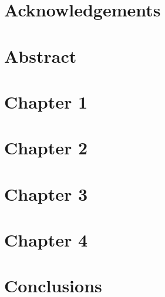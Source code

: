 \documentclass[12pt,oneside]{book}
\begin{document}
	
	
	\chapter*{Acknowledgements}  %
	
	
	
	\chapter*{Abstract}
	
	
	\tableofcontents
	\listoffigures
	\listoftables
	
	
	\chapter{Chapter 1}
	
	
	\chapter{Chapter 2}
	
	
	\chapter{Chapter 3}
	
	
	\chapter{Chapter 4}
	
	
	
	\chapter{Conclusions}
	
\end{document}
